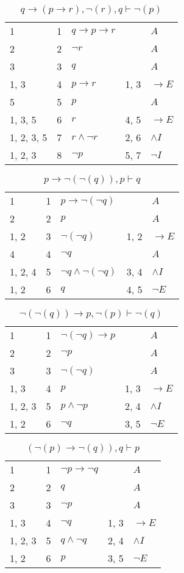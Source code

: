\documentclass{article}
\begin{document}
\begin{table}[htbp]\caption*{$q → (p → r),¬(r),q ⊢ ¬(p)$}\centering\begin{tabular}{lrlll}
{1} & 1 & $q→p→r$ & {} & $A$ \\
{2} & 2 & $¬r$ & {} & $A$ \\
{3} & 3 & $q$ & {} & $A$ \\
{1, 3} & 4 & $p→r$ & {1, 3} & $→E$ \\
{5} & 5 & $p$ & {} & $A$ \\
{1, 3, 5} & 6 & $r$ & {4, 5} & $→E$ \\
{1, 2, 3, 5} & 7 & $r∧ ¬r$ & {2, 6} & $∧I$ \\
{1, 2, 3} & 8 & $¬p$ & {5, 7} & $¬I$ \\
\end{tabular}
\end{table}
\begin{table}[htbp]\caption*{$p → ¬(¬(q)),p ⊢ q$}\centering\begin{tabular}{lrlll}
{1} & 1 & $p→ ¬ (¬q)$ & {} & $A$ \\
{2} & 2 & $p$ & {} & $A$ \\
{1, 2} & 3 & $¬ (¬q)$ & {1, 2} & $→E$ \\
{4} & 4 & $¬q$ & {} & $A$ \\
{1, 2, 4} & 5 & $¬q∧ ¬ (¬q)$ & {3, 4} & $∧I$ \\
{1, 2} & 6 & $q$ & {4, 5} & $¬E$ \\
\end{tabular}
\end{table}
\begin{table}[htbp]\caption*{$¬(¬(q)) → p,¬(p) ⊢ ¬(q)$}\centering\begin{tabular}{lrlll}
{1} & 1 & $¬ (¬q)→p$ & {} & $A$ \\
{2} & 2 & $¬p$ & {} & $A$ \\
{3} & 3 & $¬ (¬q)$ & {} & $A$ \\
{1, 3} & 4 & $p$ & {1, 3} & $→E$ \\
{1, 2, 3} & 5 & $p∧ ¬p$ & {2, 4} & $∧I$ \\
{1, 2} & 6 & $¬q$ & {3, 5} & $¬E$ \\
\end{tabular}
\end{table}
\begin{table}[htbp]\caption*{$(¬(p) → ¬(q)),q ⊢ p$}\centering\begin{tabular}{lrlll}
{1} & 1 & $¬p→ ¬q$ & {} & $A$ \\
{2} & 2 & $q$ & {} & $A$ \\
{3} & 3 & $¬p$ & {} & $A$ \\
{1, 3} & 4 & $¬q$ & {1, 3} & $→E$ \\
{1, 2, 3} & 5 & $q∧ ¬q$ & {2, 4} & $∧I$ \\
{1, 2} & 6 & $p$ & {3, 5} & $¬E$ \\
\end{tabular}
\end{table}
\end{document}
